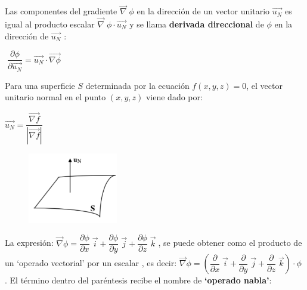 \vspace{3mm}
\vspace{3mm}

Las componentes del gradiente $\overrightarrow {\nabla} \; \phi$ en la dirección de un vector unitario $\overrightarrow {u_N}$ es igual al producto escalar $\overrightarrow {\nabla} \; \phi \cdot \overrightarrow {u_N} $ y se llama \textbf{derivada direccional} de $\phi$ en la dirección de $\overrightarrow {u_N}$ :

\centerline {$\boxed{\; \dfrac {\partial \phi}{\partial \overrightarrow {u_N}} = \overrightarrow {u_N} \cdot \overrightarrow {\nabla \phi}  \; }$}

\begin{multicols}{2}
Para una superficie $S$ determinada por la ecuación $f(x,y,z)=0$, el vector unitario normal en el punto $(x,y,z)$ viene dado por:

\hspace{15mm} $\overrightarrow {u_N}= \dfrac {\overrightarrow {\nabla f}}{|\overrightarrow {\nabla f}|}$

	\begin{figure}[H]
	\centering
	\includegraphics[width=0.35\textwidth]{imagenes/imagenes10/T10IM22.png}
	\end{figure}
\end{multicols}

La expresión: $ \overrightarrow {\nabla} \phi = \dfrac {\partial \phi}{\partial x}\; \vec i +  \dfrac {\partial \phi}{\partial y}\; \vec j +  \dfrac {\partial \phi}{\partial z}\; \vec k\;$, se puede obtener como el producto de un `operado vectorial' por un escalar , es decir:
$ \overrightarrow {\nabla} \phi = \left( \dfrac {\partial }{\partial x}\; \vec i +  \dfrac {\partial }{\partial y}\; \vec j +  \dfrac {\partial }{\partial z}\; \vec k \right) \cdot \phi\;$.
 El término dentro del paréntesis recibe el nombre de \textbf{`operado nabla'}:

\vspace{4mm}

